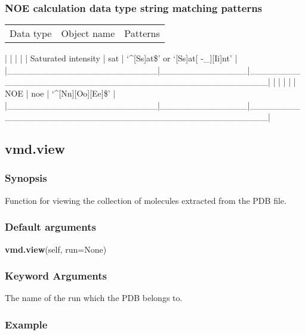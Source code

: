 \subsubsection{NOE calculation data type string matching patterns}



\begin{tabular}{ccc}
Data type & Object name & Patterns \\
\end{tabular}
|                        |              |                                                  |
| Saturated intensity    | sat          | `\^{}[Ss]at\$' or `[Ss]at[ -\_][Ii]nt'                |
|\_\_\_\_\_\_\_\_\_\_\_\_\_\_\_\_\_\_\_\_\_\_\_\_|\_\_\_\_\_\_\_\_\_\_\_\_\_\_|\_\_\_\_\_\_\_\_\_\_\_\_\_\_\_\_\_\_\_\_\_\_\_\_\_\_\_\_\_\_\_\_\_\_\_\_\_\_\_\_\_\_\_\_\_\_\_\_\_\_|
|                        |              |                                                  |
| NOE                    | noe          | `\^{}[Nn][Oo][Ee]\$'                                 |
|\_\_\_\_\_\_\_\_\_\_\_\_\_\_\_\_\_\_\_\_\_\_\_\_|\_\_\_\_\_\_\_\_\_\_\_\_\_\_|\_\_\_\_\_\_\_\_\_\_\_\_\_\_\_\_\_\_\_\_\_\_\_\_\_\_\_\_\_\_\_\_\_\_\_\_\_\_\_\_\_\_\_\_\_\_\_\_\_\_|


\newpage

\subsection{vmd.view}


\subsubsection{Synopsis}

Function for viewing the collection of molecules extracted from the PDB file.

\subsubsection{Default arguments}

\textsf{\textbf{vmd.view}(self, run=None)}


\subsubsection{Keyword Arguments}

  The name of the run which the PDB belongs to.

\subsubsection{Example}


